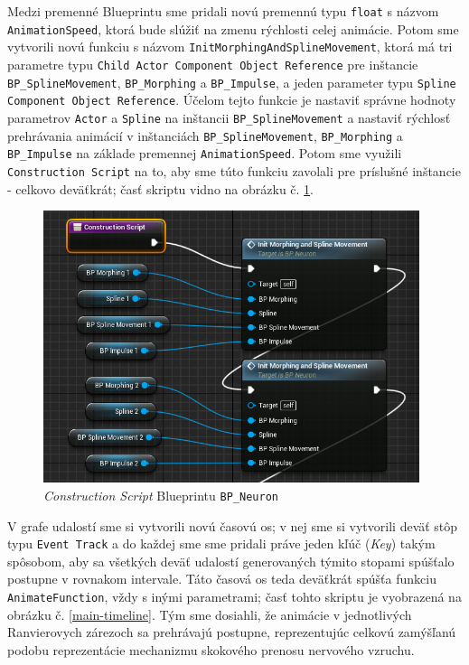 Medzi premenné Blueprintu sme pridali novú premennú typu \texttt{float} s názvom \texttt{AnimationSpeed}, ktorá bude slúžiť na zmenu rýchlosti celej animácie. Potom sme vytvorili novú funkciu s názvom \texttt{InitMorphingAndSplineMovement}, ktorá má tri parametre typu \texttt{Child Actor Component Object Reference} pre inštancie \texttt{BP\_SplineMovement}, \texttt{BP\_Morphing} a \texttt{BP\_Impulse}, a jeden parameter typu 
\texttt{Spline Component Object Reference}. Účelom tejto funkcie je nastaviť správne hodnoty parametrov \texttt{Actor} a \texttt{Spline} na inštancii \texttt{BP\_SplineMovement} a nastaviť rýchlosť prehrávania animácií v inštanciách
\texttt{BP\_SplineMovement}, \texttt{BP\_Morphing} a \texttt{BP\_Impulse} na základe premennej \texttt{AnimationSpeed}. Potom sme využili \texttt{Construction Script} na to, aby sme túto funkciu zavolali pre príslušné inštancie - 
celkovo deväťkrát; časť skriptu vidno na obrázku č. \ref{constr-script}.

\begin{figure}[!htbp]
  \centering
  \includegraphics[width=11cm]{img/constr-script.png}
  \caption{\emph{Construction Script} Blueprintu \texttt{BP\_Neuron}}
  \label{constr-script}
\end{figure}

V grafe udalostí sme si vytvorili novú časovú os; v nej sme si vytvorili deväť stôp typu \texttt{Event Track} a do každej sme sme pridali práve jeden kľúč (\emph{Key}) takým spôsobom, aby sa všetkých deväť udalostí generovaných
týmito stopami spúšťalo postupne v rovnakom intervale. Táto časová os teda deväťkrát spúšťa funkciu \texttt{AnimateFunction}, vždy s inými parametrami; časť tohto skriptu je vyobrazená na obrázku č. \ref{main-timeline}.
Tým sme dosiahli, že animácie v jednotlivých Ranvierovych zárezoch sa prehrávajú postupne, reprezentujúc celkovú zamýšľanú podobu reprezentácie mechanizmu skokového prenosu nervového vzruchu.

